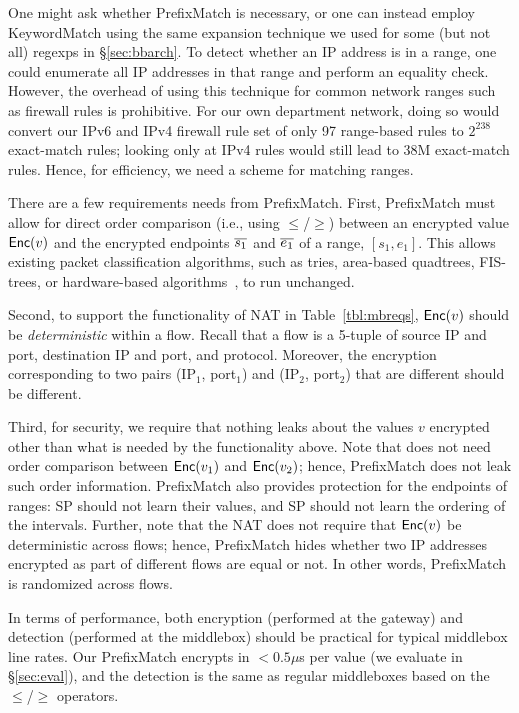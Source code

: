 One might ask whether PrefixMatch is necessary, or one can instead employ KeywordMatch using the same expansion technique we used for some (but not all) regexps in \S\ref{sec:bbarch}. 
To detect whether an IP address is in a range, one could enumerate all IP addresses in that range and perform an equality check. However, the overhead of using this technique for common network ranges such as firewall rules is prohibitive.
For our own department network, doing so would convert our IPv6 and IPv4 firewall rule set of only 97 range-based rules to $2^{238}$ exact-match  rules; looking only at IPv4 rules would still lead to 38M exact-match rules.
Hence, for efficiency, we need a scheme for matching ranges.

%
There are a few requirements \sys needs from PrefixMatch.
%
First, PrefixMatch must allow for direct order comparison (i.e., using $\leq$/$\geq$) between an encrypted value $\mathsf{Enc}(v)$ and the encrypted endpoints $\overline{s_1}$ and $\overline{e_1}$ of a range, $[s_1, e_1]$. This allows existing packet classification algorithms, such as tries, area-based quadtrees, FIS-trees, or hardware-based algorithms~\cite{packet_classif}, 
 to run unchanged. 

Second, to support the functionality of NAT in Table~\ref{tbl:mbreqs}, $\mathsf{Enc}(v)$ should be {\em deterministic} within a flow. Recall that a flow is a 5-tuple of source IP and port, destination IP and port, and protocol. Moreover, the encryption corresponding to two pairs (IP$_1$, port$_1$) and  (IP$_2$, port$_2$) that are different should be different.

Third, for security, we require that nothing leaks about the values $v$ encrypted other than what is needed by the functionality above. Note that \sys does not need order comparison between $\mathsf{Enc}(v_1)$ and $\mathsf{Enc}(v_2)$; hence, PrefixMatch does not leak such order information.  PrefixMatch also provides protection for the endpoints of ranges: SP should not learn their values, and SP should not learn the ordering of the intervals. 
 Further, note that the NAT does not require that $\mathsf{Enc}(v)$ be deterministic across flows; hence, PrefixMatch hides whether two IP addresses encrypted as part of different flows are equal or not. In other words, PrefixMatch is randomized across flows.
 


In terms of performance, both encryption (performed at the gateway) and detection (performed at the middlebox) should be practical for typical middlebox line rates.
Our PrefixMatch encrypts in $< 0.5\mu$s per value (we evaluate in \S\ref{sec:eval}), and the detection is the same as regular middleboxes based on the $\leq$/$\geq$ operators.

